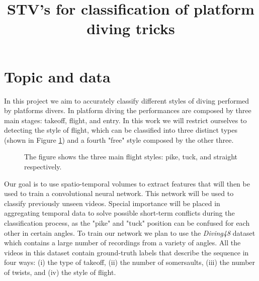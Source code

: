 \documentclass[10pt]{article}
\begin{document}
\noindent



\title{STV's for classification of platform diving tricks}


\maketitle

\section{Topic and data}

In this project we aim to accurately classify different styles of diving performed by platforms divers. In platform diving the performances are composed by three main stages: takeoff, flight, and entry. In this work we will restrict ourselves to detecting the style of flight, which can be classified into three distinct types (shown in Figure \ref{fig:dive-styles}) and a fourth "free" style composed by the other three.

\begin{figure}[!htb]
\caption{\label{fig:dive-styles} The figure shows the three main flight styles: pike, tuck, and straight respectively.}
\end{figure}

Our goal is to use spatio-temporal volumes to extract features that will then be used to train a convolutional neural network. This network will be used to classify previously unseen videos. Special importance will be placed in aggregating temporal data to solve possible short-term conflicts during the classification process, as the "pike" and "tuck" position can be confused for each other in certain angles. To train our network we plan to use the \textit{Diving48} dataset \cite{ref-diving48} which contains a large number of recordings from a variety of angles. All the videos in this dataset contain ground-truth labels that describe the sequence in four ways: (i) the type of takeoff, (ii) the number of somersaults, (iii) the number of twists, and (iv) the style of flight.
\end{document}
